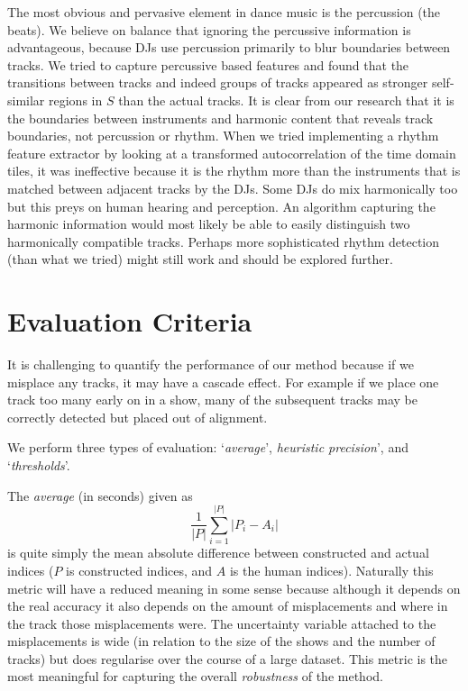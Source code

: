 \documentclass[twocolumn]{article}
\begin{document}
The most obvious and pervasive element in dance music is the percussion (the beats). We believe on balance that ignoring the percussive information is advantageous, because DJs use percussion primarily to blur boundaries between tracks.  We tried to capture percussive based features and found that the transitions between tracks and indeed groups of tracks appeared as stronger self-similar regions in $S$ than the actual tracks. It is clear from our research that it is the boundaries between instruments and harmonic content that reveals track boundaries, not percussion or rhythm. When we tried implementing a rhythm feature extractor by looking at a transformed autocorrelation of the time domain tiles, it was ineffective because it is the rhythm more than the instruments that is matched between adjacent tracks by the DJs. Some DJs do mix harmonically too but this preys on human hearing and perception. An algorithm capturing the harmonic information would most likely be able to easily distinguish two harmonically compatible tracks. Perhaps more sophisticated rhythm detection (than what we tried) might still work and should be explored further. 


\section{Evaluation Criteria}\label{eval_crit}

It is challenging to quantify the performance of our method because if we misplace any tracks, it may have a cascade effect. For example if we place one track too many early on in a show, many of the subsequent tracks may be correctly detected but placed out of alignment. 

We perform three types of evaluation: `\textit{average}', \textit{heuristic precision}', and `\textit{thresholds}'.

The \textit{average} (in seconds) given as $$\frac{1}{|P|}\sum_{i=1}^{|P|}{|P_i-A_i|}$$ is quite simply the mean absolute difference between constructed and actual indices ($P$ is constructed indices, and $A$ is the human indices). Naturally this metric will have a reduced meaning in some sense because although it depends on the real accuracy it also depends on the amount of misplacements and where in the track those misplacements were. The uncertainty variable attached to the misplacements is wide (in relation to the size of the shows and the number of tracks) but does regularise over the course of a large dataset. This metric is the most meaningful for capturing the overall \textit{robustness} of the method.
\end{document}
